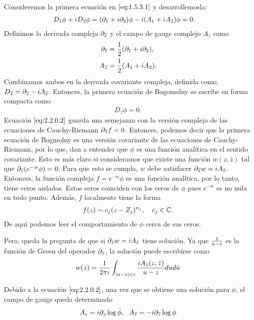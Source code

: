 Consideremos la primera ecuación en $\eqref{eq:1.5.3.1}$ y desarrollemosla:
\begin{align}
    D_1\phi+iD_2\phi &= (\partial_1+i\partial_2)\phi-i(A_1+iA_2)\phi=0.\label{eq:2.2.0.1}
\end{align}
Definimos la derivada compleja $\partial_{\overline z}$ y el campo de gauge complejo $A_{\overline z}$ como
\begin{align*}
    \partial_{\overline z} &= \frac{1}{2}(\partial_1+i\partial_2),\\
    A_{\overline z} &= \frac{1}{2}(A_1+iA_2).
\end{align*}
Combinamos ambos en la derivada covariante compleja, definida como, $D_{\overline z} = \partial_{\overline z}-iA_{\overline z}$. Entonces, la primera ecuación de Bogomolny se escribe en forma compacta como
\begin{align}
    D_{\overline z}\phi =0. \label{eq:2.2.0.2}
\end{align}
Ecuación $\eqref{eq:2.2.0.2}$ guarda una semejanza con la versión compleja de las ecuaciones de Cauchy-Riemann $\partial_{\overline z}f=0$. Entonces, podemos decir que la primera ecuación de Bogmolny es una versión covariante de las ecuaciones de Cauchy-Riemann, por lo que, dan a entender que $\phi$ es una función analítica en el sentido covariante. Esto es más claro si consideramos que existe una función $w(z,\bar z)$ tal que $\partial_{\overline z}(e^{-w}\phi)=0$. Para que esto se cumpla, $w$ debe satisfacer $\partial_{\overline z}w=iA_{\overline z}$. Entonces, la función compleja $f=e^{-w}\phi$ es una función analítica, por lo tanto, tiene ceros aislados. Estos ceros coinciden con los ceros de $\phi$ pues $e^{-w}$ es no nula en todo punto. Además, $f$ localmente tiene la forma
\begin{align*}
    f(z)\sim c_j(z-Z_j)^{n_j}, \ \ \ c_j\in\mathbb{C}.
\end{align*}
De aquí podemos leer el comportamiento de $\phi$ cerca de sus ceros.

Pero, queda la pregunta de que si $\partial_{\bar z}w=iA_{\bar z}$ tiene solución. Ya que $\frac{1}{u-z}$ es la función de Green del operador $\partial_{\bar z}$, la solución puede escribirse como
\begin{align}
    w(z) = \frac{1}{2\pi i}\int_{|u-z|<\epsilon}\frac{i A_{\bar z}(z,\bar z)}{u-z} du d\bar u \label{eq:2.2.0.3}
\end{align}

Debido a la ecuación $\eqref{eq:2.2.0.2}$, una vez que se obtiene una solución para $\phi$, el campo de gauge queda determinado
\begin{align}
    A_{z} = i\partial_{z}\log\bar\phi, \ \ A_{\overline z} = -i\partial_{\overline z}\log\phi \label{eq:2.2.0.4}
\end{align}

